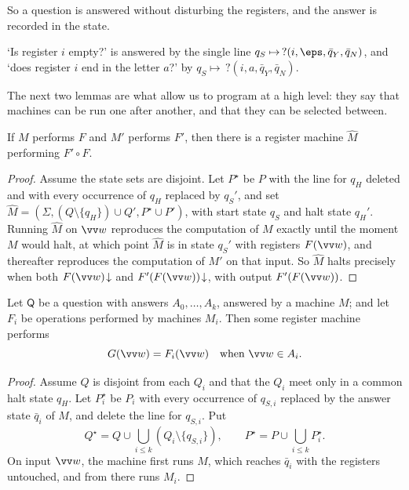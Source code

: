 So a question is answered without disturbing the registers, and the answer is recorded in the state.

\begin{example}
	`Is register $i$ empty?' is answered by the single line $q_S \mapsto\, ?(i,\eps,\bar q_Y, \bar q_N)$, and `does register $i$ end in the letter $a$?' by $q_S \mapsto\, ?(i,a,\bar q_Y, \bar q_N)$.
\end{example}

The next two lemmas are what allow us to program at a high level: they say that machines can be run one after another, and that they can be selected between.

\begin{lemma}[Concatenation]\label{lem:concat}
	If $M$ performs $F$ and $M'$ performs $F'$, then there is a register machine $\hat M$ performing $F' \circ F$.
\end{lemma}

\begin{proof}
	Assume the state sets are disjoint. Let $P^\star$ be $P$ with the line for $q_H$ deleted and with every occurrence of $q_H$ replaced by $q_S'$, and set $\hat M = (\Sigma, (Q\setminus\{q_H\})\cup Q', P^\star \cup P')$, with start state $q_S$ and halt state $q_H'$. Running $\hat M$ on $\vv w$ reproduces the computation of $M$ exactly until the moment $M$ would halt, at which point $\hat M$ is in state $q_S'$ with registers $F(\vv w)$, and thereafter reproduces the computation of $M'$ on that input. So $\hat M$ halts precisely when both $F(\vv w)\!\downarrow$ and $F'(F(\vv w))\!\downarrow$, with output $F'(F(\vv w))$.
\end{proof}

\begin{lemma}\label{lem:cases}
	Let $\mathsf{Q}$ be a question with answers $A_0, \dots, A_k$, answered by a machine $M$; and let $F_i$ be operations performed by machines $M_i$. Then some register machine performs
	$$G(\vv w) = F_i(\vv w) \quad\text{when } \vv w \in A_i.$$
\end{lemma}

\begin{proof}
	Assume $Q$ is disjoint from each $Q_i$ and that the $Q_i$ meet only in a common halt state $q_H$. Let $P_i^\star$ be $P_i$ with every occurrence of $q_{S,i}$ replaced by the answer state $\bar q_i$ of $M$, and delete the line for $q_{S,i}$. Put
	$$Q^\star = Q \cup \bigcup_{i\leq k}(Q_i\setminus\{q_{S,i}\}), \qquad P^\star = P \cup \bigcup_{i\leq k}P_i^\star.$$
	On input $\vv w$, the machine first runs $M$, which reaches $\bar q_i$ with the registers untouched, and from there runs $M_i$.
\end{proof}

